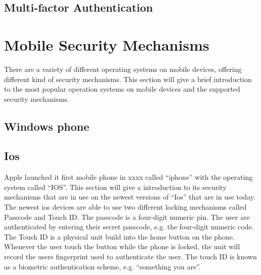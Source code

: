     \subsection{Multi-factor Authentication}

  \clearpage
  \section{Mobile Security Mechanisms}

    There are a variety of different operating systems on mobile devices, offering different kind of security mechanisms. This section will give a brief introduction to the most popular operation systems on mobile devices and the supported security mechanisms.
    

    \subsection{Windows phone}

    \subsection{Ios}

    Apple launched it first mobile phone in xxxx called ``iphone'' with the operating system called ``IOS''. This section will give a introduction to its security mechanisms that are in use on the newest versions of ``Ios'' that are in use today. The newest ios devices are able to use two different locking mechanisms called Passcode and Touch ID. The passcode is a four-digit numeric pin. The user are authenticated by entering their secret passcode, e.g. the four-digit numeric code. The Touch ID is a physical unit build into the home button on the phone. Whenever the user touch the button while the phone is locked, the unit will record the users fingerprint used to authenticate the user. The touch ID is known as a biometric authentication scheme, e.g. ``something you are''.

